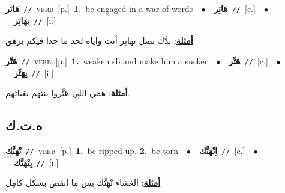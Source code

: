 \documentclass[10pt,a4paper,twoside]{article} %
\begin{document}
\begin{multicols}{2}
{\setlength\topsep{0pt}\textbf{\foreignlanguage{arabic}{هَاتَر}}\ {\color{gray}\texttt{//}\color{black}}\ \textsc{verb}\ [p.]\ \textbf{1.}~be engaged in a war of words\ \ $\bullet$\ \ \setlength\topsep{0pt}\textbf{\foreignlanguage{arabic}{هَاتِر}}\ {\color{gray}\texttt{//}\color{black}}\ [c.]\ \ $\bullet$\ \ \setlength\topsep{0pt}\textbf{\foreignlanguage{arabic}{يهَاتِر}}\ {\color{gray}\texttt{//}\color{black}}\ [i.]\  \begin{flushright}\color{gray}\foreignlanguage{arabic}{\textbf{\underline{\foreignlanguage{arabic}{أمثلة}}}: بدَّك تضل تهاتِر أنت واياه لحد ما حدا فيكم يزهق}\end{flushright}\color{black}} \vspace{2mm}

{\setlength\topsep{0pt}\textbf{\foreignlanguage{arabic}{هَتَّر}}\ {\color{gray}\texttt{//}\color{black}}\ \textsc{verb}\ [p.]\ \textbf{1.}~weaken sb and make him a sucker\ \ $\bullet$\ \ \setlength\topsep{0pt}\textbf{\foreignlanguage{arabic}{هَتِّر}}\ {\color{gray}\texttt{//}\color{black}}\ [c.]\ \ $\bullet$\ \ \setlength\topsep{0pt}\textbf{\foreignlanguage{arabic}{يهَتِّر}}\ {\color{gray}\texttt{//}\color{black}}\ [i.]\  \begin{flushright}\color{gray}\foreignlanguage{arabic}{\textbf{\underline{\foreignlanguage{arabic}{أمثلة}}}: همي اللي هَتَّروا بنتهم بغبائهم.}\end{flushright}\color{black}} \vspace{2mm}

\vspace{-3mm}
\subsection*{\color{blue}\foreignlanguage{arabic}{ه.ت.ك}\color{blue}{}} 

{\setlength\topsep{0pt}\textbf{\foreignlanguage{arabic}{تْهَتَّك}}\ {\color{gray}\texttt{//}\color{black}}\ \textsc{verb}\ [p.]\ \textbf{1.}~be ripped up.  \textbf{2.}~be torn\ \ $\bullet$\ \ \setlength\topsep{0pt}\textbf{\foreignlanguage{arabic}{اِتْهَتَّك}}\ {\color{gray}\texttt{//}\color{black}}\ [c.]\ \ $\bullet$\ \ \setlength\topsep{0pt}\textbf{\foreignlanguage{arabic}{يِتْهَتَّك}}\ {\color{gray}\texttt{//}\color{black}}\ [i.]\  \begin{flushright}\color{gray}\foreignlanguage{arabic}{\textbf{\underline{\foreignlanguage{arabic}{أمثلة}}}: الغشاء تْهَتَّك بس ما انفض بشكل كامِل}\end{flushright}\color{black}} \vspace{2mm}


\end{multicols}
\end{document}

